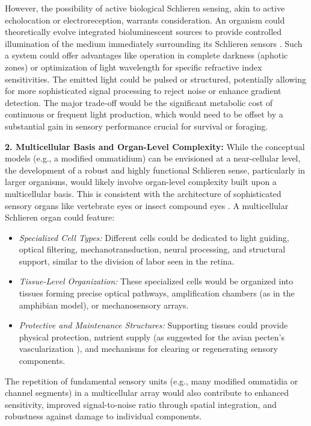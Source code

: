 \documentclass[11pt]{article}
\begin{document}
However, the possibility of active biological Schlieren sensing, akin to active echolocation or electroreception, warrants consideration. An organism could theoretically evolve integrated bioluminescent sources to provide controlled illumination of the medium immediately surrounding its Schlieren sensors \cite{Haddock2010Bioluminescence}. Such a system could offer advantages like operation in complete darkness (aphotic zones) or optimization of light wavelength for specific refractive index sensitivities. The emitted light could be pulsed or structured, potentially allowing for more sophisticated signal processing to reject noise or enhance gradient detection. The major trade-off would be the significant metabolic cost of continuous or frequent light production, which would need to be offset by a substantial gain in sensory performance crucial for survival or foraging.

\textbf{2. Multicellular Basis and Organ-Level Complexity:}
While the conceptual models (e.g., a modified ommatidium) can be envisioned at a near-cellular level, the development of a robust and highly functional Schlieren sense, particularly in larger organisms, would likely involve organ-level complexity built upon a multicellular basis. This is consistent with the architecture of sophisticated sensory organs like vertebrate eyes or insect compound eyes \cite{Land2012AnimalEyes}.
A multicellular Schlieren organ could feature:
    \begin{itemize}
        \item \textit{Specialized Cell Types:} Different cells could be dedicated to light guiding, optical filtering, mechanotransduction, neural processing, and structural support, similar to the division of labor seen in the retina.
        \item \textit{Tissue-Level Organization:} These specialized cells would be organized into tissues forming precise optical pathways, amplification chambers (as in the amphibian model), or mechanosensory arrays.
        \item \textit{Protective and Maintenance Structures:} Supporting tissues could provide physical protection, nutrient supply (as suggested for the avian pecten's vascularization \cite{Meyer1977AvianEye}), and mechanisms for clearing or regenerating sensory components.
    \end{itemize}
The repetition of fundamental sensory units (e.g., many modified ommatidia or channel segments) in a multicellular array would also contribute to enhanced sensitivity, improved signal-to-noise ratio through spatial integration, and robustness against damage to individual components.
\end{document}
